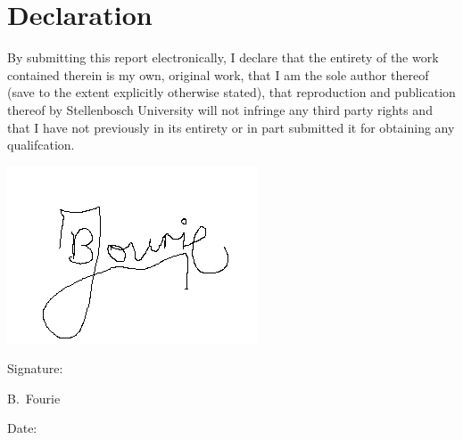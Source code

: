 \chapter{Declaration}

By submitting this report electronically, I declare that the entirety of the work contained
therein is my own, original work, that I am the sole author thereof (save to the extent
explicitly otherwise stated), that reproduction and publication thereof by Stellenbosch
University will not infringe any third party rights and that I have not previously in its
entirety or in part submitted it for obtaining any qualifcation.

\vspace{3cm}

\hspace{3cm}
\includegraphics[scale=0.4]{./Figures/Signature.png}\\
\noindent%
\parbox{.5\textwidth}{%
  Signature:\quad\dotfill\par
  \hfill B.\ Fourie\hspace{1.2cm}\null}


\vspace{1.5cm}
\noindent%
\parbox{.5\textwidth}{%
  Date:\quad\dotfill\par}
